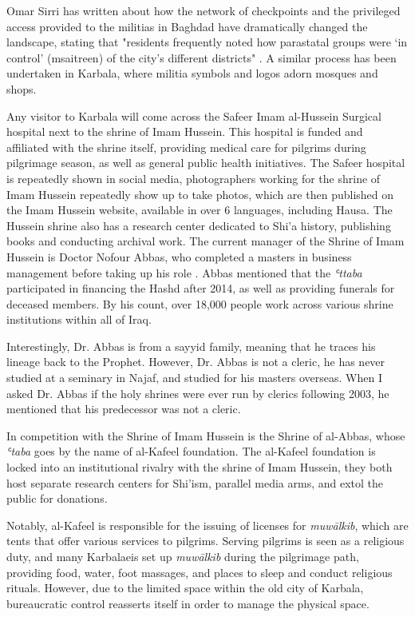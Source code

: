 Omar Sirri has written about how the network of checkpoints and the privileged access provided to the militias in Baghdad have dramatically changed the landscape, stating that "residents frequently noted how parastatal groups were ‘in control’ (msaitreen) of the city’s different districts" \cite[14]{omar_sirri_destructive_2021}. A similar process has been undertaken in Karbala, where militia symbols and logos adorn mosques and shops. 

Any visitor to Karbala will come across the Safeer Imam al-Hussein Surgical hospital next to the shrine of Imam Hussein. This hospital is funded and affiliated with the shrine itself, providing medical care for pilgrims during pilgrimage season, as well as general public health initiatives. The Safeer hospital is repeatedly shown in social media, photographers working for the shrine of Imam Hussein repeatedly show up to take photos, which are then published on the Imam Hussein website, available in over 6 languages, including Hausa. The Hussein shrine also has a research center dedicated to Shi'a history, publishing books and conducting archival work. The current manager of the Shrine of Imam Hussein is Doctor Nofour Abbas, who completed a masters in business management before taking up his role \cite{nofour_abbas_interview_2021}. Abbas mentioned that the \emph{ʿttaba} participated in financing the Hashd after 2014, as well as providing funerals for deceased members. By his count, over 18,000 people work across various shrine institutions within all of Iraq. 

Interestingly, Dr. Abbas is from a sayyid family, meaning that he traces his lineage back to the Prophet. However, Dr. Abbas is not a cleric, he has never studied at a seminary in Najaf, and studied for his masters overseas. When I asked Dr. Abbas if the holy shrines were ever run by clerics following 2003, he mentioned that his predecessor was not a cleric. 

In competition with the Shrine of Imam Hussein is the Shrine of al-Abbas, whose \emph{ʿtaba} goes by the name of al-Kafeel foundation. The al-Kafeel foundation is locked into an institutional rivalry with the shrine of Imam Hussein, they both host separate research centers for Shi'ism, parallel media arms, and extol the public for donations. 

Notably, al-Kafeel is responsible for the issuing of licenses for \emph{muwālkib}, which are tents that offer various services to pilgrims. Serving pilgrims is seen as a religious duty, and many Karbalaeis set up \emph{muwālkib} during the pilgrimage path, providing food, water, foot massages, and places to sleep and conduct religious rituals. However, due to the limited space within the old city of Karbala, bureaucratic control reasserts itself in order to manage the physical space. 

